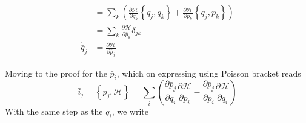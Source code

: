 \documentclass[../../../main.tex]{subfiles}
\begin{document}
\begin{align*}
	                 & = \sum_k \left( \frac{\partial \mathcal{H }}{\partial \bar{q }_k }\left\{ \bar{q }_j,\bar{q }_k  \right\}+\frac{\partial \mathcal{H }}{\partial \bar{p }_k }\left\{ \bar{q }_j,\bar{p }_k \right\} \right)                                                               \\
	                 & = \sum_k \frac{\partial \mathcal{H }}{\partial \bar{p }_k }\delta_{jk }                                                                                                                                                                                                  \\
	\dot{\bar{q }}_j & =\frac{\partial \mathcal{H }}{\partial \bar{p }_j}
\end{align*}

Moving to the proof for the $\bar{p }_i$, which on expressing using Poisson bracket reads
\begin{equation*}
	\dot{\bar{i}}_j=\left\{ \bar{p }_j,\mathcal{H} \right\}=\sum_i \left( \frac{\partial \bar{p }_j }{\partial q_i }\frac{\partial \mathcal{H } }{\partial p_i }-\frac{\partial \bar{p }_j }{\partial p_i }\frac{\partial \mathcal{H } }{\partial q_i} \right)
\end{equation*}
With the same step as the $\bar{q }_i $, we write
\end{document}
